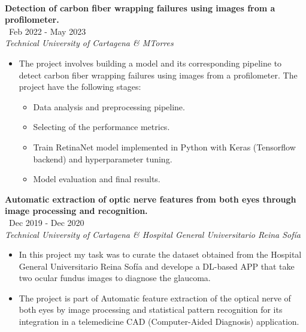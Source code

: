\documentclass[10pt]{article}
\begin{document}
\vspace{0.5cm}
\noindent{\LARGE \textcolor{black}{Machine Learning}}
\vspace{-1.5pt}
\par\noindent\hrulefill %
\\[0.35cm]
\noindent\textbf{Detection of carbon fiber wrapping failures using images from a profilometer.} 
\\[0.15cm]
 \hfill {\ \small Feb 2022 - May 2023}
\\[0.15cm]
\emph{Technical University of Cartagena \& MTorres} \hfill 
	\begin{itemize}[itemsep = -0.75 mm, leftmargin=*]
	\item[{\color[RGB]{10,0,254}$\bullet$}] \noindent 	The project involves building a model and its corresponding pipeline to detect carbon
	fiber wrapping failures using images from a profilometer. The project have the following stages:
	\begin{itemize}
		\item Data analysis and preprocessing pipeline.
		\item Selecting of the performance metrics.
		\item Train RetinaNet model implemented in Python with Keras (Tensorflow backend) and hyperparameter tuning.
		\item Model evaluation and final results. 
	\end{itemize}
	\end{itemize} 	

\noindent\textbf{Automatic extraction of optic nerve features from both eyes through image processing and recognition.}
\\[0.15cm]
 \hfill {\ \small Dec 2019 - Dec 2020}
\\[0.15cm]
\emph{Technical University of Cartagena \& Hospital General Universitario Reina Sofía} \hfill  
	\begin{itemize}[itemsep = -0.75 mm, leftmargin=*]
	\item[{\color[RGB]{10,0,254}$\bullet$}] \noindent In this project my task was to curate the dataset obtained from the Hospital General Universitario Reina Sofía and develope a DL-based APP
	that take two ocular fundus images to diagnose the glaucoma.
	\item[{\color[RGB]{10,0,254}$\bullet$}] \noindent The project is part of Automatic feature extraction of the optical nerve of both eyes by
	image processing and statistical pattern recognition for its integration in a telemedicine CAD (Computer-Aided Diagnosis) application. 
	\end{itemize} 	
\end{document}
